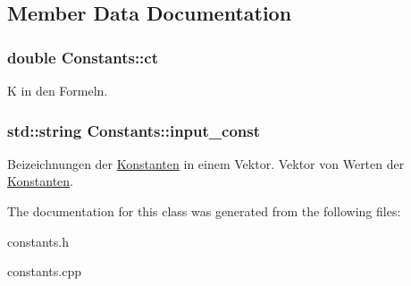 \subsection{Member Data Documentation}
\hypertarget{classConstants_aefb49d707a69e32ab5c0abb04bef07e2}{
\subsubsection[{ct}]{\setlength{\rightskip}{0pt plus 5cm}double Constants\-::ct}}\label{classConstants_aefb49d707a69e32ab5c0abb04bef07e2}
K in den Formeln. \hypertarget{classConstants_a6551e0c666c13d6c4fca96ee5585fa7c}{
\subsubsection[{input\-\_\-const}]{\setlength{\rightskip}{0pt plus 5cm}std\-::string Constants\-::input\-\_\-const}}\label{classConstants_a6551e0c666c13d6c4fca96ee5585fa7c}
Beizeichnungen der \hyperlink{classKonstanten}{Konstanten} in einem Vektor. Vektor von Werten der \hyperlink{classKonstanten}{Konstanten}. 

The documentation for this class was generated from the following files\-:\begin{DoxyCompactItemize}
\item 
constants.\-h\item 
constants.\-cpp\end{DoxyCompactItemize}
